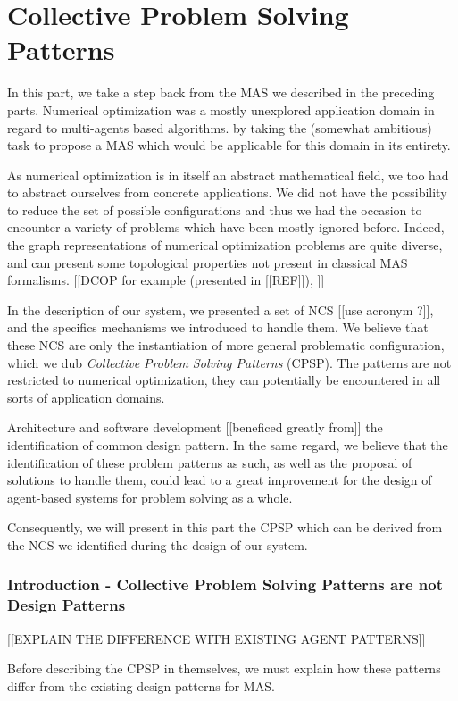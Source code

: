 \part{Collective Problem Solving Patterns}

In this part, we take a step back from the MAS we described in the preceding parts.
Numerical optimization was a mostly unexplored application domain in regard to multi-agents based algorithms. by taking the (somewhat ambitious) task to propose a MAS which would be applicable for this domain in its entirety.

As numerical optimization is in itself an abstract mathematical field, we too had to abstract ourselves from concrete applications. We did not have the possibility to reduce the set of possible configurations and thus we had the occasion to encounter a variety of problems which have been mostly ignored before. Indeed, the graph representations of numerical optimization problems are quite diverse, and can present some topological properties not present in classical MAS formalisms. [[DCOP for example (presented in [[REF]]), ]]

In the description of our system, we presented a set of NCS [[use acronym ?]], and the specifics mechanisms we introduced to handle them. We believe that these NCS are only the instantiation of more general problematic configuration, which we dub \emph{Collective Problem Solving Patterns} (CPSP). The patterns are not restricted to numerical optimization, they can potentially be encountered in all sorts of application domains.

Architecture and software development [[beneficed greatly from]] the identification of common design pattern. In the same regard, we believe that the identification of these problem patterns as such, as well as the proposal of solutions to handle them, could lead to a great improvement for the design of agent-based systems for problem solving as a whole.

Consequently, we will present in this part the CPSP which can be derived from the NCS we identified during the design of our system.


\section{Introduction - Collective Problem Solving Patterns are not Design Patterns}

[[EXPLAIN THE DIFFERENCE WITH EXISTING AGENT PATTERNS]]

Before describing the CPSP in themselves, we must explain how these patterns differ from the existing design patterns for MAS.

